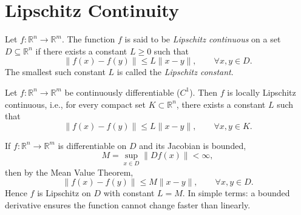 \section{Lipschitz Continuity}

\begin{definition}
    Let $f: \mathbb{R}^n \to \mathbb{R}^m$.  
    The function $f$ is said to be \emph{Lipschitz continuous} on a set $D \subseteq \mathbb{R}^n$ if there exists a constant $L \geq 0$ such that
    \begin{equation}
        \| f(x) - f(y) \| \leq L \| x - y \|, \qquad \forall x,y \in D.
    \end{equation}
    The smallest such constant $L$ is called the \emph{Lipschitz constant}.
\end{definition}


\begin{theorem}
    Let $f: \mathbb{R}^n \to \mathbb{R}^m$ be continuously differentiable ($C^1$).  
    Then $f$ is locally Lipschitz continuous, i.e., for every compact set $K \subset \mathbb{R}^n$, there exists a constant $L$ such that
    \begin{equation}
        \| f(x) - f(y) \| \leq L \| x - y \|, \qquad \forall x,y \in K.
    \end{equation}
\end{theorem}


\begin{remark}
    If $f:\mathbb{R}^n \to \mathbb{R}^m$ is differentiable on $D$ and its Jacobian is bounded,
    \begin{equation}
        M = \sup_{x \in D} \|Df(x)\| < \infty,
    \end{equation}
    then by the Mean Value Theorem,
    \begin{equation}
        \|f(x)-f(y)\| \leq M \|x-y\|, \qquad \forall x,y \in D.
    \end{equation}
    Hence $f$ is Lipschitz on $D$ with constant $L=M$.  
    In simple terms: a bounded derivative ensures the function cannot change faster than linearly.
\end{remark}


